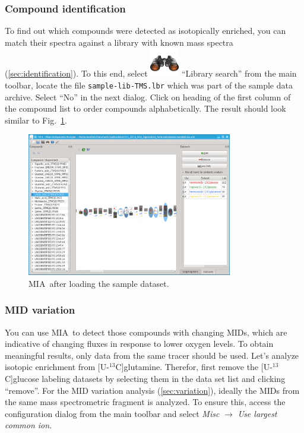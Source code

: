 \documentclass[a4paper,12pt]{scrartcl}
\newcommand*\app{\textsc{MIA}}
\begin{document}
\subsubsection{Compound identification}

To find out which compounds were detected as isotopically enriched, you can match their spectra against a library with known mass spectra (\ref{sec:identification}). To this end, select \includegraphics{gfx/edit-find.png} ``Library search'' from the main toolbar, locate the file \texttt{sample-lib-TMS.lbr} which was part of the sample data archive. Select ``No'' in the next dialog. Click on heading of the first column of the compound list to order compounds alphabetically. The result should look similar to Fig.~\ref{fig:tutorial-identified}.

\begin{figure}[htbp]
 \centering
 \includegraphics[width=0.8\textwidth]{./gfx/ss_tutorial_identified.png}
 \caption{\app\ after loading the sample dataset.}
 \label{fig:tutorial-identified}
\end{figure}

\subsubsection{MID variation}

You can use \app\ to detect those compounds with changing MIDs, which are indicative of changing fluxes in response to lower oxygen levels. To obtain meaningful results, only data from the same tracer should be used. Let's analyze isotopic enrichment from [U-$^{13}$C]glutamine. Therefor, first remove the [U-$^{13}$C]glucose labeling datasets by selecting them in the data set list and clicking ``remove''. For the MID variation analysis (\ref{sec:variation}), ideally the MIDs from the same mass spectrometric fragment is analyzed. To ensure this, access the configuration dialog from the main toolbar and select \textit{Misc} $\rightarrow$ \textit{Use largest common ion}.
\end{document}
